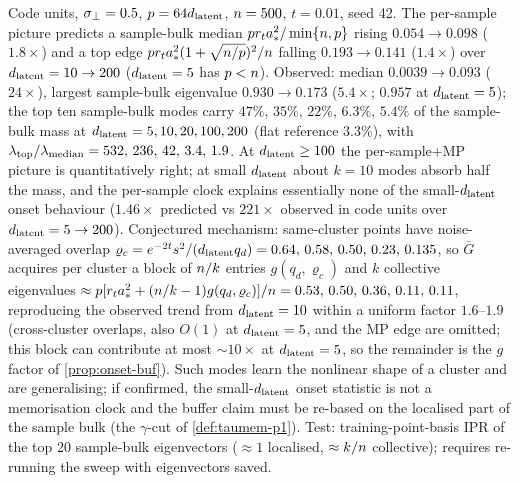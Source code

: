 \begin{remark}\label{rem:collective-pred}
Code units, $\sigma_{\perp}=0.5$, $p=64d_{\mathrm{latent}}$, $n=500$, $t=0.01$, seed 42. The per-sample picture predicts a sample-bulk median $p r_ta_*^2/\min\{n,p\}$ rising $0.054\to0.098$ ($1.8\times$) and a top edge $p r_ta_*^2(1+\sqrt{n/p})^2/n$ falling $0.193\to0.141$ ($1.4\times$) over $d_{\mathrm{latent}}=10\to200$ ($d_{\mathrm{latent}}=5$ has $p<n$). Observed: median $0.0039\to0.093$ ($24\times$), largest sample-bulk eigenvalue $0.930\to0.173$ ($5.4\times$; $0.957$ at $d_{\mathrm{latent}}=5$); the top ten sample-bulk modes carry $47\%,\,35\%,\,22\%,\,6.3\%,\,5.4\%$ of the sample-bulk mass at $d_{\mathrm{latent}}=5,10,20,100,200$ (flat reference $3.3\%$), with $\lambda_{\rm top}/\lambda_{\rm median}=532,\,236,\,42,\,3.4,\,1.9$. At $d_{\mathrm{latent}}\ge100$ the per-sample+MP picture is quantitatively right; at small $d_{\mathrm{latent}}$ about $k=10$ modes absorb half the mass, and the per-sample clock explains essentially none of the small-$d_{\mathrm{latent}}$ onset behaviour ($1.46\times$ predicted vs $221\times$ observed in code units over $d_{\mathrm{latent}}=5\to200$). Conjectured mechanism: same-cluster points have noise-averaged overlap $\varrho_c=e^{-2t}s^2/(d_{\mathrm{latent}} q_d)=0.64,\,0.58,\,0.50,\,0.23,\,0.135$, so $\bar G$ acquires per cluster a block of $n/k$ entries $g(q_d,\varrho_c)$ and $k$ collective eigenvalues $\approx p[r_ta_*^2+(n/k-1)g(q_d,\varrho_c)]/n=0.53,\,0.50,\,0.36,\,0.11,\,0.11$, reproducing the observed trend from $d_{\mathrm{latent}}=10$ within a uniform factor $1.6$--$1.9$ (cross-cluster overlaps, also $O(1)$ at $d_{\mathrm{latent}}=5$, and the MP edge are omitted; this block can contribute at most $\sim10\times$ at $d_{\mathrm{latent}}=5$, so the remainder is the $g$ factor of \cref{prop:onset-buf}). Such modes learn the nonlinear shape of a cluster and are generalising; if confirmed, the small-$d_{\mathrm{latent}}$ onset statistic is not a memorisation clock and the buffer claim must be re-based on the localised part of the sample bulk (the $\gamma$-cut of \cref{def:taumem-p1}). Test: training-point-basis IPR of the top 20 sample-bulk eigenvectors ($\approx1$ localised, $\approx k/n$ collective); requires re-running the sweep with eigenvectors saved.
\end{remark}

